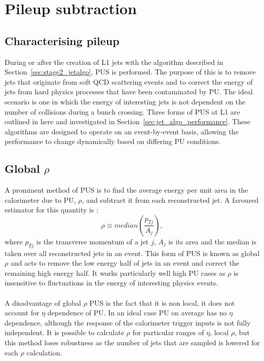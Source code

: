 \section{Pileup subtraction}
\label{sec:pus}

\subsection{Characterising pileup}

During or after the creation of L1 jets with the algorithm described in Section~\ref{sec:stage2_jetalgo}, PUS is performed. The purpose of this is to remove jets that originate from soft QCD scattering events and to correct the energy of jets from hard physics processes that have been contaminated by PU. The ideal scenario is one in which the energy of interesting jets is not dependent on the number of collisions during a bunch crossing. Three forms of PUS at L1 are outlined in here and investigated in Section~\ref{sec:jet_algo_performance}. These algorithms are designed to operate on an event-by-event basis, allowing the performance to change dynamically based on differing PU conditions. 

\subsection{Global \boldmath $\rho$}
A prominent method of PUS is to find the average energy per unit area in the calorimeter due to PU, $\rho$, and subtract it from each reconstructed jet. A favoured estimator for this quantity is \cite{global_rho}:
\begin{equation}
\rho\equiv median(\frac{p_{Tj}}{A_j}),
\end{equation}
where $p_{Tj}$ is the transverse momentum of a jet $j$, $A_j$ is its area and the median is taken over all reconstructed jets in an event. This form of PUS is known as global $\rho$ and acts to remove the low energy half of jets in an event and correct the remaining high energy half. It works particularly well high PU cases as $\rho$ is insensitive to fluctuations in the energy of interesting physics events. 
\\\\
A disadvantage of global $\rho$ PUS is the fact that it is non local, it does not account for $\eta$ dependence of PU. In an ideal case PU on average has no $\eta$ dependence, although the response of the calorimeter trigger inputs is not fully independent. It is possible to calculate $\rho$ for particular ranges of $\eta$, local $\rho$, but this method loses robustness as the number of jets that are sampled is lowered for each $\rho$ calculation. 

